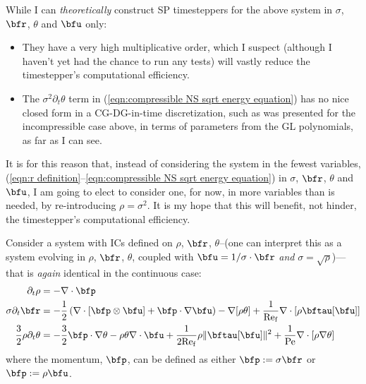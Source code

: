     \begin{remark}
        While I can \emph{theoretically} construct SP timesteppers for the above system in $\sigma$, $\bfr$, $\theta$ and $\bfu$ only:
        \begin{itemize}
            \item  They have a very high multiplicative order, which I suspect (although I haven't yet had the chance to run any tests) will vastly reduce the timestepper's computational efficiency.
            \item  The $\sigma^{2}\partial_{t}\theta$ term in (\ref{eqn:compressible NS sqrt energy equation}) has no nice closed form in a CG-DG-in-time discretization, such as was presented for the incompressible case above, in terms of parameters from the GL polynomials, as far as I can see.
        \end{itemize}
        It is for this reason that, instead of considering the system in the fewest variables, (\ref{eqn:r definition}--\ref{eqn:compressible NS sqrt energy equation}) in $\sigma$, $\bfr$, $\theta$ and $\bfu$, I am going to elect to consider one, for now, in more variables than is needed, by re-introducing $\rho = \sigma^{2}$. It is my hope that this will benefit, not hinder, the timestepper's computational efficiency.
    \end{remark}

    Consider a system with ICs defined on $\rho$, $\bfr$, $\theta$--(one can interpret this as a system evolving in $\rho$, $\bfr$, $\theta$, coupled with $\bfu = 1/\sigma\cdot\bfr$ \emph{and} $\sigma = \sqrt{\rho}$)---that is \emph{again} identical in the continuous case:
    \begin{align}
                         \partial_{t}\rho  &=  - \nabla\cdot\bfp  \label{eqn:compressible NS final mass equation}  \\
                   \sigma\partial_{t}\bfr  &=  - \frac{1}{2}\left(\nabla\cdot\left[\bfp\otimes\bfu\right] + \bfp\cdot\nabla\bfu\right) - \nabla[\rho\theta] + \frac{1}{\rmRef}\nabla\cdot\left[\rho\bftau[\bfu]\right]  \\
        \frac{3}{2}\rho\partial_{t}\theta  &=  - \frac{3}{2}\bfp\cdot\nabla\theta - \rho\theta\nabla\cdot\bfu + \frac{1}{2\rmRef}\rho\|\bftau[\bfu]\|^{2} + \frac{1}{\rmPe}\nabla\cdot\left[\rho\nabla\theta\right]  \label{eqn:compressible NS final energy equation}
    \end{align}
    where the momentum, $\bfp$, can be defined as either $\bfp := \sigma\bfr$ or $\bfp := \rho\bfu$.

